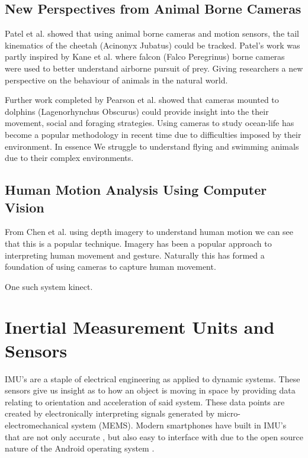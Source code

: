 \subsection{New Perspectives from Animal Borne Cameras}
Patel et al. \cite{patel2017trackingieee} showed that using animal borne cameras and motion sensors, the tail kinematics of the cheetah (Acinonyx Jubatus) could be tracked. Patel's work was partly inspired by Kane et al. \cite{kane2014falcons} where falcon (Falco Peregrinus) borne cameras were used to better understand airborne pursuit of prey. Giving researchers a new perspective on the behaviour of animals in the natural world.

Further work completed by Pearson et al. \cite{pearson2017testing} showed that cameras mounted to dolphins (Lagenorhynchus Obscurus) could provide insight into the their movement, social and foraging strategies. Using cameras to study ocean-life has become a popular methodology in recent time due to difficulties imposed by their environment. In essence We struggle to understand flying and swimming animals due to their complex environments.










\subsection{Human Motion Analysis Using Computer Vision}
From Chen et al.\cite{chen2013survey} using depth imagery to understand human motion we can see that this is a popular technique. Imagery has been a popular approach to interpreting human movement and gesture. Naturally this has formed a foundation of using cameras to capture human movement.

One such system kinect.
















\section{Inertial Measurement Units and Sensors}
IMU's are a staple of electrical engineering as applied to dynamic systems. These sensors give us insight as to how an object is moving in space by providing data relating to orientation and acceleration of said system. These data points are created by electronically interpreting signals generated by micro-electromechanical system (MEMS). Modern smartphones have built in IMU's that are not only accurate \cite{gikas2016rigorous}, but also easy to interface with due to the open source nature of the Android operating system \cite{androidSensorLib}.  

